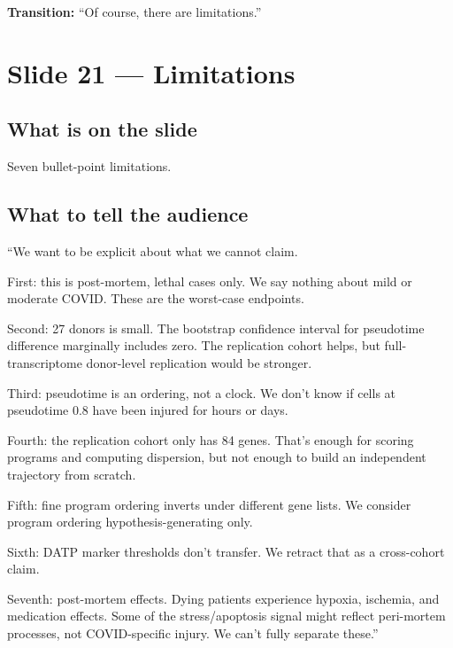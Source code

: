 \documentclass[11pt]{article}
\begin{document}
\textbf{Transition:} ``Of course, there are limitations.''


\section{Slide 21 --- Limitations}

\subsection{What is on the slide}

Seven bullet-point limitations.

\subsection{What to tell the audience}

\begin{speaknote}
``We want to be explicit about what we cannot claim.

First: this is post-mortem, lethal cases only. We say nothing about mild or moderate COVID. These are the worst-case endpoints.

Second: 27 donors is small. The bootstrap confidence interval for pseudotime difference marginally includes zero. The replication cohort helps, but full-transcriptome donor-level replication would be stronger.

Third: pseudotime is an ordering, not a clock. We don't know if cells at pseudotime 0.8 have been injured for hours or days.

Fourth: the replication cohort only has 84 genes. That's enough for scoring programs and computing dispersion, but not enough to build an independent trajectory from scratch.

Fifth: fine program ordering inverts under different gene lists. We consider program ordering hypothesis-generating only.

Sixth: DATP marker thresholds don't transfer. We retract that as a cross-cohort claim.

Seventh: post-mortem effects. Dying patients experience hypoxia, ischemia, and medication effects. Some of the stress/apoptosis signal might reflect peri-mortem processes, not COVID-specific injury. We can't fully separate these.''
\end{speaknote}
\end{document}
